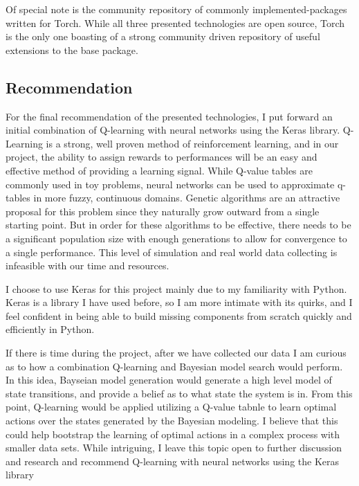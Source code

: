 \documentclass[draftclsnofoot,onecolumn,letterpaper,10pt]{IEEEtran}
\begin{document}
Of special note is the community repository of commonly implemented-packages written for Torch.
While all three presented technologies are open source, Torch is the only one boasting of a strong community driven repository of useful extensions to the base package.

\subsection{Recommendation}
For the final recommendation of the presented technologies, I put forward an initial combination of Q-learning with neural networks using the Keras library.
Q-Learning is a strong, well proven method of reinforcement learning, and in our project, the ability to assign rewards to performances will be an easy and effective method of providing a learning signal.
While Q-value tables are commonly used in toy problems, neural networks can be used to approximate q-tables in more fuzzy, continuous domains.
Genetic algorithms are an attractive proposal for this problem since they naturally grow outward from a single starting point.
But in order for these algorithms to be effective, there needs to be a significant population size with enough generations to allow for convergence to a single performance.
This level of simulation and real world data collecting is infeasible with our time and resources.

I choose to use Keras for this project mainly due to my familiarity with Python. 
Keras is a library I have used before, so I am more intimate with its quirks, and I feel confident in being able to build missing components from scratch quickly and efficiently in Python.

If there is time during the project, after we have collected our data I am curious as to how a combination Q-learning and Bayesian model search would perform.
In this idea, Bayseian model generation would generate a high level model of state transitions, and provide a belief as to what state the system is in.
From this point, Q-learning would be applied utilizing a Q-value tabnle to learn optimal actions over the states generated by the Bayesian modeling.
I believe that this could help bootstrap the learning of optimal actions in a complex process with smaller data sets.
While intriguing, I leave this topic open to further discussion and research and recommend Q-learning with neural networks using the Keras library
\newpage


\end{document}
